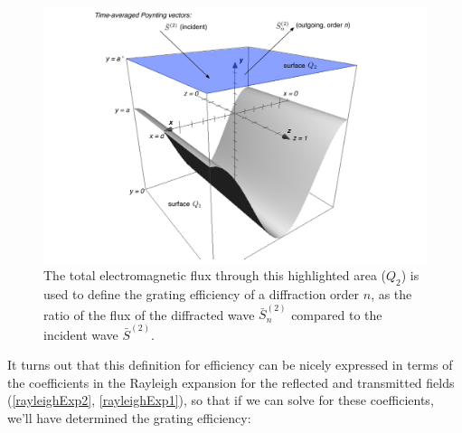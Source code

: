 \begin{figure}[htb] %
   \centering
   \includegraphics[scale=0.5]{../data/Chapter2/2c_poynting/2c.pdf} 
   \caption{The total electromagnetic flux through this highlighted area ($Q_2$) is used to define the grating efficiency of a diffraction order $n$, as the ratio of the flux of the diffracted wave $\bar S_n^{(2)}$ compared to the incident wave $\bar S^{(2)}$.}
   \label{2c}
\end{figure}

It turns out that this definition for efficiency can be nicely expressed in terms of the coefficients in the Rayleigh expansion for the reflected and transmitted fields (\ref{rayleighExp2}, \ref{rayleighExp1}), so that if we can solve for these coefficients, we'll have determined the grating efficiency:
